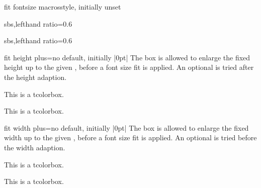 \begin{docTcbKey}{fit fontsize macros}{}{style, initially unset}
\begin{dispExample*}{sbs,lefthand ratio=0.6}
\end{dispExample*}


\begin{dispExample*}{sbs,lefthand ratio=0.6}

\tcboxfit[height=5cm,
  fit fontsize macros,
  fonttitle=\normalsize\bfseries,
  title=Adapted title]
{\lipsum[2]}

\end{dispExample*}
\end{docTcbKey}


\clearpage
\begin{docTcbKey}{fit height plus}{=}{no default, initially |0pt|}
  The box is allowed to enlarge the fixed height up to the given ,
  before a font size fit is applied. An optional 
  is tried after the height adaption.
\begin{dispExample}

\begin{tcolorbox}[fit]
This is a tcolorbox.
\end{tcolorbox}
\begin{tcolorbox}[fit,fit height plus=1cm]
This is a tcolorbox.
\end{tcolorbox}
\begin{tcolorbox}[fit]
\lipsum[2]
\end{tcolorbox}
\begin{tcolorbox}[fit,fit height plus=1cm]
\lipsum[2]
\end{tcolorbox}
\end{dispExample}
\end{docTcbKey}


\begin{docTcbKey}{fit width plus}{=}{no default, initially |0pt|}
  The box is allowed to enlarge the fixed width up to the given ,
  before a font size fit is applied. An optional 
  is tried before the width adaption.
  \enlargethispage*{1cm}
\begin{dispExample}

\begin{tcolorbox}[fit]
This is a tcolorbox.
\end{tcolorbox}
\begin{tcolorbox}[fit,fit width plus=1cm]
This is a tcolorbox.
\end{tcolorbox}
\begin{tcolorbox}[fit]
\lipsum[2]
\end{tcolorbox}
\begin{tcolorbox}[fit,fit width plus=1cm]
\lipsum[2]
\end{tcolorbox}
\end{dispExample}
\end{docTcbKey}


